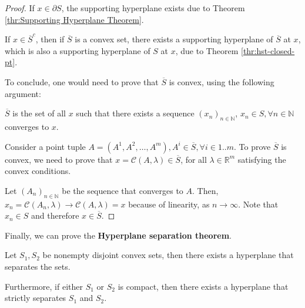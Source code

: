 \begin{proof}
  If \( x \in \partial S \), the supporting hyperplane exists due to Theorem
  \ref{thr:Supporting Hyperplane Theorem}.

  If \( x \in \overline{S}^{c} \), then if \(\overline{S} \) is a convex set,
  there exists a supporting hyperplane of \( \overline{S} \) at \( x \), which
  is also a supporting hyperplane of \( S \) at \( x \), due to Theorem
  \ref{thr:hst-closed-pt}.

  To conclude, one would need to prove that \( \overline{S} \) is convex, using
  the following argument:

    \( \overline{S} \) is the set of all \( x \) such that there exists a
    sequence \( (x_{n})_{n \in \mathbb{N}} \), \( x_{n} \in S, \forall n \in
    \mathbb{N} \) converges to \( x \).

    Consider a point tuple \( A = (A^{1}, A^{2}, \ldots , A^{m}), A^{i} \in
    \overline{S}, \forall i \in 1..m \). To prove \( \overline{S}
    \) is convex, we need to prove that \( x = \mathcal{C}(A, \lambda) \in
    \overline{S} \), for
    all \( \lambda \in \mathbb{R}^{m} \) satisfying the convex conditions.

    Let \( (A_{n})_{n \in \mathbb{N}} \) be the sequence that converges to \( A
    \). Then, \( x_{n} = \mathcal{C}(A_{n}, \lambda) \to  \mathcal{C}(A, \lambda) =
    x\) because of linearity, as \( n \to  \infty \). Note that \( x_{n} \in S
    \) and therefore \( x \in \overline{S} \).
\end{proof}

Finally, we can prove the \textbf{Hyperplane separation theorem}.
\begin{theorem}
\label{thr:Hyperplane Separation Theorem}
  Let \( S_{1}, S_{2} \) be nonempty disjoint convex sets, then there exists a
  hyperplane that separates the sets.

  Furthermore, if either \( S_{1} \) or \( S_{2} \) is compact, then there exists a
  hyperplane that strictly separates \( S_{1} \) and \( S_{2} \).
\end{theorem}

